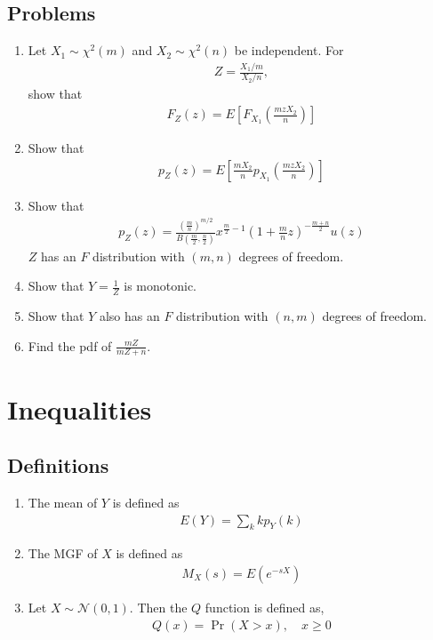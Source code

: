 \documentclass[journal,12pt,onecolumn]{IEEEtran}
\renewcommand\thesection{\arabic{section}}
\renewcommand\thesubsection{\thesection.\arabic{subsection}}
\providecommand{\pr}[1]{\ensuremath{\Pr\left(#1\right)}}
\providecommand{\sbrak}[1]{\ensuremath{{}\left[#1\right]}}
\providecommand{\brak}[1]{\ensuremath{\left(#1\right)}}
\theoremstyle{remark}
\numberwithin{equation}{section}
\begin{document}
\subsection{Problems}
\begin{enumerate}[label=\arabic*.,ref=\thesubsection.\theenumi]
\item Let $X_1 \sim \chi^2\brak{m}$ and $X_2 \sim \chi^2\brak{n}$ be independent.  For 
	\begin{align}
		Z = \frac{X_1/m}{X_2/n},
	\end{align}
	show that 
	\begin{align}
		F_Z(z) = E\sbrak{F_{X_1}\brak{\frac{mzX_2}{n}}}
	\end{align}
\item Show that 
	\begin{align}
		p_Z(z) = E\sbrak{\frac{mX_2}{n}p_{X_1}\brak{\frac{mzX_2}{n}}}
	\end{align}
\item Show that 
	\begin{align}
		p_Z(z) = \frac{\brak{\frac{m}{n}}^{m/2}}{B\brak{\frac{m}{2},\frac{n}{2}}}x^{\frac{m}{2}-1}\brak{1 + \frac{m}{n}z}^{-\frac{m+n}{2}}u(z)
	\end{align}
 $Z$ has an $F$ distribution with \brak{m, n} degrees of freedom.
		\item Show that $Y = \frac{1}{Z}$ is monotonic. 
		\item Show that $Y$ also has
			an $F$ distribution with \brak{n, m} degrees of freedom.
		\item  Find the pdf of $\frac{mZ}{mZ + n}$. 

\end{enumerate}

\section{Inequalities}
\subsection{Definitions}
\begin{enumerate}[label=\arabic*.,ref=\thesubsection.\theenumi]
\item The mean of $Y$ is defined as
\begin{align}
E\brak{Y} = \sum_{k}kp_Y(k)
\end{align}
\item The MGF of $X$ is defined as 
\begin{align}
	M_{X}(s) = E\brak{e^{-sX}}
\end{align}
\item Let 
 $X \sim \mathcal{N}(0, 1)$.  Then the 
	$Q$ function is defined as,
\begin{align}
	Q(x) = \pr{X>x}, \quad x \ge 0
\end{align}

\end{enumerate}
\end{document}
